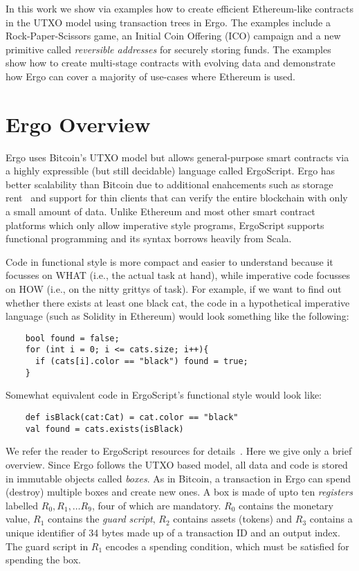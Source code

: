 \documentclass[runningheads]{llncs}
\newcommand{\langname}{ErgoScript\xspace}
\begin{document}
In this work we show via examples how to create efficient Ethereum-like contracts in the UTXO model using transaction trees in Ergo. 
The examples include a Rock-Paper-Scissors game, an Initial Coin Offering (ICO) campaign and a new primitive called {\em reversible addresses} for securely storing funds. The examples show how to create multi-stage contracts with evolving data and demonstrate how Ergo can cover a majority of use-cases where Ethereum is used.  


\section{Ergo Overview}
\label{ergo-overview}

Ergo uses Bitcoin's UTXO model but allows general-purpose smart contracts via a highly expressible (but still decidable) language called \langname. Ergo has better scalability than Bitcoin due to additional enahcements such as storage rent~\cite{chepurnoy2018systematic} and support for thin clients that can verify the entire blockchain with only a small amount of data. Unlike Ethereum and most other smart contract platforms which only allow imperative style programs, \langname supports functional programming and its syntax borrows heavily from Scala. 

Code in functional style is more compact and easier to understand because it focusses on WHAT (i.e., the actual task at hand), while imperative code focusses on HOW (i.e., on the nitty grittys of task). For example, if we want to find out whether there exists at least one black cat, the code in a hypothetical imperative language (such as Solidity in Ethereum) would look something like the following:
\begin{verbatim}
    bool found = false;
    for (int i = 0; i <= cats.size; i++){
      if (cats[i].color == "black") found = true; 
    }
\end{verbatim}

Somewhat equivalent code in \langname's functional style would look like:

\begin{verbatim}
    def isBlack(cat:Cat) = cat.color == "black"
    val found = cats.exists(isBlack)
\end{verbatim}

We refer the reader to \langname resources for details~\cite{langrepo,tutorial,advtutorial}. Here we give only a brief overview.
Since Ergo follows the UTXO based model, all data and code is stored in immutable objects called {\em boxes}. As in Bitcoin, a transaction in Ergo can spend (destroy) multiple boxes and create new ones. 
A box is made of upto ten {\em registers} labelled $R_0, R_1,\ldots R_9$, four of which are mandatory. $R_0$ contains the monetary value, $R_1$ contains the {\em guard script}, $R_2$ contains assets (tokens) and $R_3$ contains a unique identifier of 34 bytes made up of a transaction ID and an output index. The guard script in $R_1$ encodes a spending condition, which must be satisfied for spending the box. 
\end{document}
